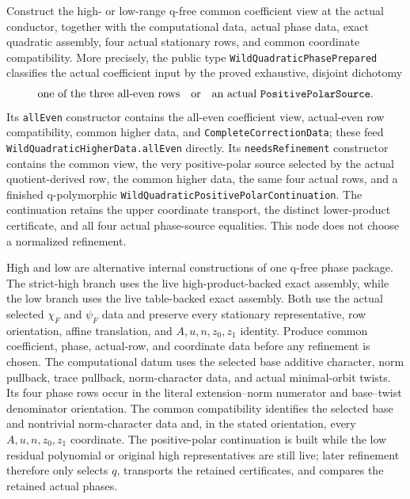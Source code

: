 \begin{theorem}
\label{mod:cases-wildquadratic-phasepreparation}
Construct the high- or low-range q-free common coefficient view at the actual
conductor, together with the computational data, actual phase data, exact
quadratic assembly, four actual stationary rows, and common coordinate
compatibility.  More precisely, the public type
\texttt{WildQuadraticPhasePrepared} classifies the actual coefficient input
by the proved exhaustive, disjoint dichotomy
\[
 \text{one of the three all-even rows}
 \quad\text{or}\quad
 \text{an actual \texttt{PositivePolarSource}}.
\]
Its \texttt{allEven} constructor contains the all-even coefficient view,
actual-even row compatibility, common higher data, and
\texttt{CompleteCorrectionData}; these feed
\texttt{WildQuadraticHigherData.allEven} directly.  Its
\texttt{needsRefinement} constructor contains the common view, the very
positive-polar source selected by the actual quotient-derived row, the common
higher data, the same four actual rows, and a finished q-polymorphic
\texttt{WildQuadraticPositivePolarContinuation}.  The continuation retains
the upper coordinate transport, the distinct lower-product certificate, and
all four actual phase-source equalities.  This node does not choose a
normalized refinement.

High and low are alternative internal constructions of one q-free phase
package.  The strict-high branch uses the live high-product-backed exact
assembly, while the low branch uses the live table-backed exact assembly.
Both use the actual selected \(\chi_F\) and \(\psi_F\) data and preserve every
stationary representative, row orientation, affine translation, and
\(A,u,n,z_0,z_1\) identity.
\leanok
{}
\FormalizationContract
Produce common coefficient, phase, actual-row, and coordinate data before
any refinement is chosen.  The computational datum uses the selected base
additive character, norm pullback, trace pullback, norm-character data, and
actual minimal-orbit twists.  Its four phase rows occur in the literal
extension--norm numerator and base--twist denominator orientation.  The
common compatibility identifies the selected base and nontrivial
norm-character data and, in the stated orientation, every
\(A,u,n,z_0,z_1\) coordinate.  The positive-polar continuation is built while
the low residual polynomial or original high representatives are still live;
later refinement therefore only selects \(q\), transports the retained
certificates, and compares the retained actual phases.


\end{theorem}
